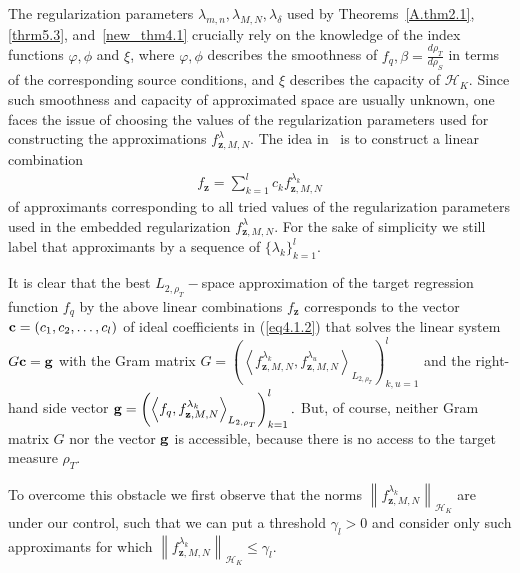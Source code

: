 \documentclass[USenglish]{article}
\newcommand{\norm}[1]{\left\lVert#1\right\rVert}
\newcommand{\innerpro}[1]{\left\langle#1\right\rangle}
\newcommand{\hk}{{\mathcal{H}_K}}
\begin{document}
The regularization parameters $\lambda_{m,n}, \lambda_{M,N}, \lambda_\delta$ used by Theorems~\ref{A.thm2.1}, \ref{thrm5.3}, and~\ref{new_thm4.1} crucially rely on the knowledge of the index functions $\varphi, \phi $ and $\xi$, where $\varphi, \phi $ describes the smoothness of $f_q, \beta = \frac{d\rho_T}{d\rho_S}$ in terms of the corresponding source conditions, and $\xi$ describes the capacity of $\hk$. Since such smoothness and capacity of approximated space are usually unknown, one faces the issue of choosing the values of the regularization parameters used  
for constructing the approximations $f_{\mathbf{z},M,N}^{\lambda}$.
The idea in~\cite{gizewski2022regularization,dinu2022aggregation} is to construct a linear combination 
	\begin{align}\label{eq4.1.2}
	f_\mathbf{z} = \sum_{k = 1}^l c_k f_{\mathbf{z},M,N}^{\lambda_k}
	\end{align}
of approximants corresponding to all tried values of the regularization parameters used in the embedded regularization  $f_{\mathbf{z},M,N}^{\lambda}$. For the sake of simplicity we still label that approximants by a sequence of $\{\lambda_k\}_{k=1}^l$.

It is clear that the best $L_{2,\rho_T}-$space approximation of the target regression function $f_q$ by the above linear combinations $f_\mathbf{z}$ corresponds to the vector ${{\bf c}} = (c_1,c_2,\ldots,c_l)$ of ideal coefficients in (\ref{eq4.1.2}) that solves the linear system $G{{\bf c}} = {{\bf g}}$ with the Gram matrix $G = \left(  \innerpro{ f_{\mathbf{z},M,N}^{\lambda_k}, f_{\mathbf{z},M,N}^{\lambda_u}}_{L_{2,\rho_T}} \right)_{k,u=1}^l$ and the right-hand side vector ${{\bf g}} = \left( \innerpro{f_q , f_{\mathbf{z},M,N}^{\lambda_k} }_{L_{2,\rho_T}} \right)_{k=1}^l.$ But, of course, neither Gram matrix $G$ nor the vector ${{\bf g}}$ is accessible, because there is no access to the target measure $\rho_T.$
	
To overcome this obstacle we first observe that the norms $\norm{f_{\mathbf{z},M,N}^{\lambda_k}  }_{\mathcal{H}_K}  $ are under our control, such that we can put a threshold $\gamma_l > 0 $ and consider only such approximants
for which $\norm{f_{\mathbf{z},M,N}^{\lambda_k}  }_{\mathcal{H}_K} \leq \gamma_l. $
\end{document}
